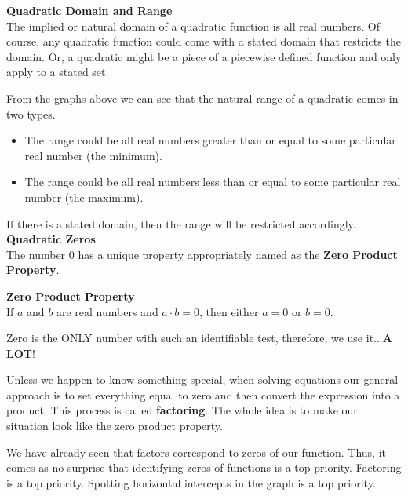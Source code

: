 \documentclass{ximera}
\begin{document}
\textbf{\textcolor{blue!75!black}{Quadratic Domain and Range}} \\


The implied or natural domain of a quadratic function is all real numbers.  Of course, any quadratic function could come with a stated domain that restricts the domain. Or, a quadratic might be a piece of a piecewise defined function and only apply to a stated set.

From the graphs above we can see that the natural range of a quadratic comes in two types.  

\begin{itemize}
\item The range could be all real numbers greater than or equal to some particular real number (the minimum).
\item The range could be all real numbers less than or equal to some particular real number (the maximum).
\end{itemize}

If there is a stated domain, then the range will be restricted accordingly. \\





\textbf{\textcolor{blue!75!black}{Quadratic Zeros}} \\

The number $0$ has a unique property appropriately named as the \textbf{Zero Product Property}.  



\begin{definition}  \textbf{\textcolor{green!50!black}{Zero Product Property}} \\

If $a$ and $b$ are real numbers and $a\cdot b = 0$, then either $a=0$ or $b=0$.

\end{definition}


Zero is the ONLY number with such an identifiable test, therefore, we use it...\textbf{\textcolor{purple!85!blue}{A LOT}}! 


Unless we happen to know something special, when solving equations our general approach is to set everything equal to zero and then convert the expression into a product.  This process is called \textbf{factoring}.  The whole idea is to make our situation look like the zero product property.

We have already seen that factors correspond to zeros of our function. Thus, it comes as no surprise that identifying zeros of functions is a top priority.  Factoring is a top priority. Spotting horizontal intercepts in the graph is a top priority.
\end{document}
